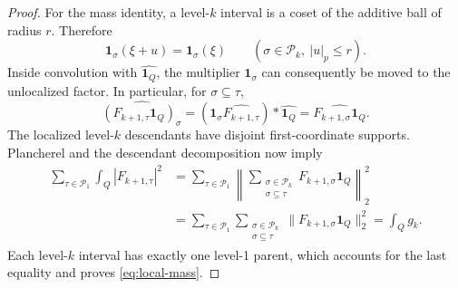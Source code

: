 \documentclass[11pt,twoside,a4paper]{article}
\numberwithin{equation}{section}
\theoremstyle{definition}
\newcommand{\one}{\mathbf 1}
\newcommand{\cP}{\mathcal P}
\begin{document}
\begin{proof}
For the mass identity, a level-$k$ interval is a coset of the additive ball of radius $r$. Therefore
$$
\one_\sigma(\xi+u)=\one_\sigma(\xi)
\qquad(\sigma\in\cP_k,\ |u|_p\le r).
$$
Inside convolution with $\widehat{\one_Q}$, the multiplier $\one_\sigma$ can consequently be moved to the unlocalized factor. In particular, for $\sigma\subseteq\tau$,
$$
\widehat{(F_{k+1,\tau}\one_Q)_\sigma}
=(\one_\sigma\widehat{F_{k+1,\tau}})*\widehat{\one_Q}
=\widehat{F_{k+1,\sigma}\one_Q}.
$$
The localized level-$k$ descendants have disjoint first-coordinate supports. Plancherel and the descendant decomposition now imply
$$
\begin{aligned}
\sum_{\tau\in\cP_1}\int_Q|F_{k+1,\tau}|^2
&=\sum_{\tau\in\cP_1}\left\|\sum_{\substack{\sigma\in\cP_k\\\sigma\subseteq\tau}}
F_{k+1,\sigma}\one_Q\right\|_2^2\\
&=\sum_{\tau\in\cP_1}\sum_{\substack{\sigma\in\cP_k\\\sigma\subseteq\tau}}
\|F_{k+1,\sigma}\one_Q\|_2^2
=\int_Qg_k.
\end{aligned}
$$
Each level-$k$ interval has exactly one level-1 parent, which accounts for the last equality and proves \eqref{eq:local-mass}.
\end{proof}
\end{document}
